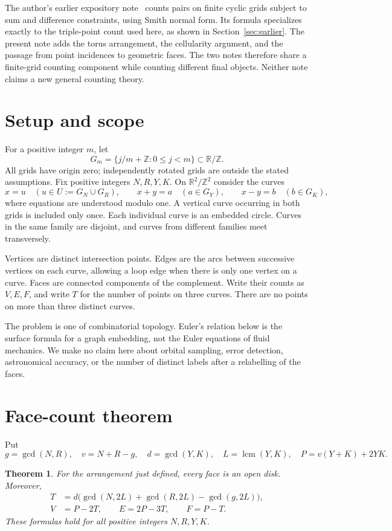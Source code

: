 \documentclass[a4paper,11pt]{article}
\newtheorem{theorem}{Theorem}
\newcommand{\Torus}{\mathbb{R}^2/\mathbb{Z}^2}
\begin{document}
The author's earlier expository note~\cite[pp. 2--5, Theorem 1 and
Corollary 1]{Walke2026} counts pairs on finite cyclic grids subject to
sum and difference constraints, using Smith normal form. Its formula
specializes exactly to the triple-point count used here, as shown in
Section~\ref{sec:earlier}. The present note adds the torus arrangement,
the cellularity argument, and the passage from point incidences to
geometric faces. The two notes therefore share a finite-grid counting
component while counting different final objects. Neither note claims a
new general counting theory.

\section{Setup and scope}
For a positive integer $m$, let
\[
 G_m=\{j/m+\mathbb Z:0\leq j<m\}\subset\mathbb R/\mathbb Z.
\]
All grids have origin zero; independently rotated grids are outside the
stated assumptions. Fix positive integers $N,R,Y,K$. On $\Torus$ consider
the curves
\[
 x=u\quad(u\in U:=G_N\cup G_R),\qquad
 x+y=a\quad(a\in G_Y),\qquad
 x-y=b\quad(b\in G_K),
\]
where equations are understood modulo one. A vertical curve occurring in
both grids is included only once. Each individual curve is an embedded
circle. Curves in the same family are disjoint, and curves from different
families meet transversely.

Vertices are distinct intersection points. Edges are the arcs between
successive vertices on each curve, allowing a loop edge when there is only
one vertex on a curve. Faces are connected components of the complement.
Write their counts as $V,E,F$, and write $T$ for the number of points on
three curves. There are no points on more than three distinct curves.

The problem is one of combinatorial topology. Euler's relation below is
the surface formula for a graph embedding, not the Euler equations of
fluid mechanics. We make no claim here about orbital sampling, error
detection, astronomical accuracy, or the number of distinct labels after
a relabelling of the faces.

\section{Face-count theorem}
Put
\[
 g=\gcd(N,R),\quad v=N+R-g,\quad d=\gcd(Y,K),\quad
 L=\operatorname{lcm}(Y,K),\quad P=v(Y+K)+2YK.
\]

\begin{theorem}\label{thm:main}
For the arrangement just defined, every face is an open disk. Moreover,
\begin{align}
 T&=d\bigl(\gcd(N,2L)+\gcd(R,2L)-\gcd(g,2L)\bigr),\label{eq:triple}\\
 V&=P-2T,\qquad E=2P-3T,\qquad F=P-T.\label{eq:counts}
\end{align}
These formulas hold for all positive integers $N,R,Y,K$.
\end{theorem}
\end{document}
